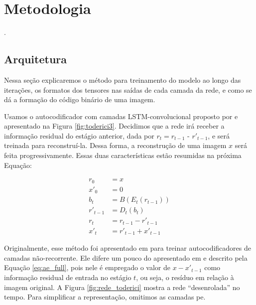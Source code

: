 \chapter{Metodologia}


.  

\section{Arquitetura} \label{sec:arq}

Nessa seção explicaremos o método para treinamento do modelo ao longo das iterações, os formatos dos tensores nas saídas de cada camada da rede, e como se dá a formação do código binário de uma imagem.   

Usamos o autocodificador com camadas LSTM-convolucional proposto por \cite{FullResolution2017Toderici} e apresentado na Figura \ref{fig:toderici3}. 
Decidimos que a rede irá receber a informação residual do estágio anterior, dada por $ r_t = r_{t-1}$ - $r'_{t-1}$, e será treinada para reconstruí-la. Dessa forma, a reconstrução de uma imagem $x$ será feita progressivamente. Essas duas características estão resumidas na próxima Equação:

\begin{equation}
\label{eq:model_1it}
\begin{aligned}
r_{0} &=x\\
x'_0  &=0 \\
b_{t} &= B(E_{t}(r_{t-1})) \\
r'_{t-1} &= D_{t}(b_{t}) \\
r_{t} &= r_{t-1}- r'_{t-1} \\
x'_t &= r'_{t-1} + x'_{t-1}  
\end{aligned}
\end{equation}

Originalmente, esse método foi apresentado em \cite{Variable2016Toderici} para treinar autocodificadores de camadas não-recorrente. 
Ele difere um pouco do apresentado em \cite{FullResolution2017Toderici} e descrito pela Equação \ref{eq:ae_full},  pois nele é empregado o valor de $x-x'_{t-1}$ como  informação residual de entrada no estágio $t$, ou seja, o resíduo em relação à imagem original.
A Figura \ref{fig:rede_toderici} mostra a rede ``desenrolada'' no tempo. Para simplificar a representação, omitimos as camadas \acrshort{pe}. 

